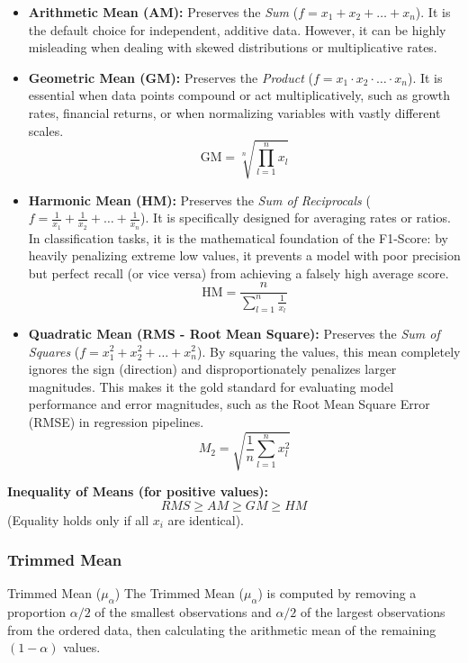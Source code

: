 \begin{itemize}
    \item \textbf{Arithmetic Mean (AM):} Preserves the \textit{Sum} ($f = x_1 + x_2 + \dots + x_n$). It is the default choice for independent, additive data. However, it can be highly misleading when dealing with skewed distributions or multiplicative rates.
    
    \vs

    \item \textbf{Geometric Mean (GM):} Preserves the \textit{Product} ($f = x_1 \cdot x_2 \cdot \dots \cdot x_n$). It is essential when data points compound or act multiplicatively, such as growth rates, financial returns, or when normalizing variables with vastly different scales. 
    $$\text{GM} = \sqrt[n]{\prod_{l=1}^{n} x_l}$$
    
    \item \textbf{Harmonic Mean (HM):} Preserves the \textit{Sum of Reciprocals} ($f = \frac{1}{x_1} + \frac{1}{x_2} + \dots + \frac{1}{x_n}$). It is specifically designed for averaging rates or ratios. In classification tasks, it is the mathematical foundation of the F1-Score: by heavily penalizing extreme low values, it prevents a model with poor precision but perfect recall (or vice versa) from achieving a falsely high average score.
    $$\text{HM} = \frac{n}{\sum_{l=1}^{n} \frac{1}{x_l}}$$
    
    \item \textbf{Quadratic Mean (RMS - Root Mean Square):} Preserves the \textit{Sum of Squares} ($f = x_1^2 + x_2^2 + \dots + x_n^2$). By squaring the values, this mean completely ignores the sign (direction) and disproportionately penalizes larger magnitudes. This makes it the gold standard for evaluating model performance and error magnitudes, such as the Root Mean Square Error (RMSE) in regression pipelines.
    $$M_2 = \sqrt{\frac{1}{n} \sum_{l=1}^{n} x_l^2}$$
\end{itemize}

\textbf{Inequality of Means (for positive values):}
$$RMS \geq AM \geq GM \geq HM$$ 
(Equality holds only if all $x_i$ are identical).

\subsubsection{Trimmed Mean}

\begin{defbox}{Trimmed Mean ($\mu_\alpha$)}
The Trimmed Mean ($\mu_\alpha$) is computed by removing a proportion $\alpha/2$ of the smallest observations and $\alpha/2$ of the largest observations from the ordered data, then calculating the arithmetic mean of the remaining $(1-\alpha)$ values.
\end{defbox}

